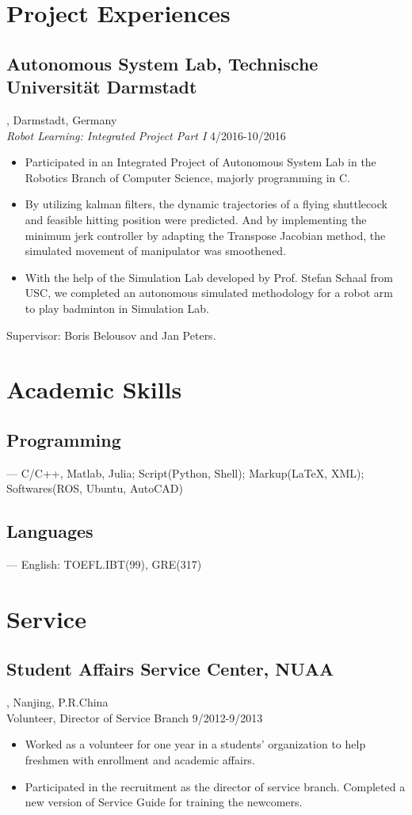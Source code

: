 \documentclass{article}
\begin{document}
\section{Project Experiences}
\subsection{Autonomous System Lab, Technische Universit\"at Darmstadt}, Darmstadt, Germany\\
\emph{Robot Learning: Integrated Project Part I }\hfill 4/2016-10/2016
\begin{itemize}[noitemsep,topsep=1pt]
\item Participated in an Integrated Project of Autonomous System Lab in the Robotics Branch of Computer Science, majorly programming in  C.
\item By utilizing kalman filters, the dynamic trajectories of a flying shuttlecock and feasible hitting position were predicted. And by implementing the minimum jerk controller by adapting the Transpose Jacobian method, the simulated movement of manipulator was smoothened.
\item With the help of the Simulation Lab developed by Prof. Stefan Schaal from USC, we completed an autonomous simulated methodology for a robot arm to play badminton in Simulation Lab.
\end{itemize}
Supervisor: Boris Belousov and Jan Peters.

\section{Academic Skills}
\subsection{Programming}
--- C/C++, Matlab, Julia; Script(Python, Shell); Markup({\LaTeX}, XML); Softwares(ROS, Ubuntu, AutoCAD)
\subsection{Languages}
--- English: TOEFL.IBT(99), GRE(317)

\section{Service}
\subsection{Student Affairs Service Center, NUAA}, Nanjing, P.R.China\\
Volunteer, Director of Service Branch \hfill9/2012-9/2013
\begin{itemize}[noitemsep,topsep=1pt]
\item Worked as a volunteer for one year in a students' organization to help freshmen with enrollment and academic affairs.
\item Participated in the recruitment as the director of service branch. Completed a new version of Service Guide for training the newcomers.   
\end{itemize}
\end{document}
